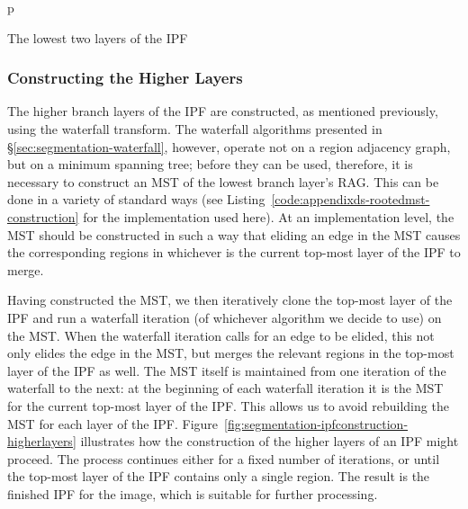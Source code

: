 \begin{stusubfig}{p}
	\hspace{12mm}%
\caption{The lowest two layers of the IPF}
\label{fig:segmentation-ipfconstruction-lowestbranchlayer}
\end{stusubfig}

\subsubsection{Constructing the Higher Layers}

The higher branch layers of the IPF are constructed, as mentioned previously, using the waterfall transform. The waterfall algorithms presented in \S\ref{sec:segmentation-waterfall}, however, operate not on a region adjacency graph, but on a minimum spanning tree; before they can be used, therefore, it is necessary to construct an MST of the lowest branch layer's RAG. This can be done in a variety of standard ways (see Listing~\ref{code:appendixds-rootedmst-construction} for the implementation used here). At an implementation level, the MST should be constructed in such a way that eliding an edge in the MST causes the corresponding regions in whichever is the current top-most layer of the IPF to merge.

Having constructed the MST, we then iteratively clone the top-most layer of the IPF and run a waterfall iteration (of whichever algorithm we decide to use) on the MST. When the waterfall iteration calls for an edge to be elided, this not only elides the edge in the MST, but merges the relevant regions in the top-most layer of the IPF as well. The MST itself is maintained from one iteration of the waterfall to the next: at the beginning of each waterfall iteration it is the MST for the current top-most layer of the IPF. This allows us to avoid rebuilding the MST for each layer of the IPF. Figure~\ref{fig:segmentation-ipfconstruction-higherlayers} illustrates how the construction of the higher layers of an IPF might proceed. The process continues either for a fixed number of iterations, or until the top-most layer of the IPF contains only a single region. The result is the finished IPF for the image, which is suitable for further processing.

